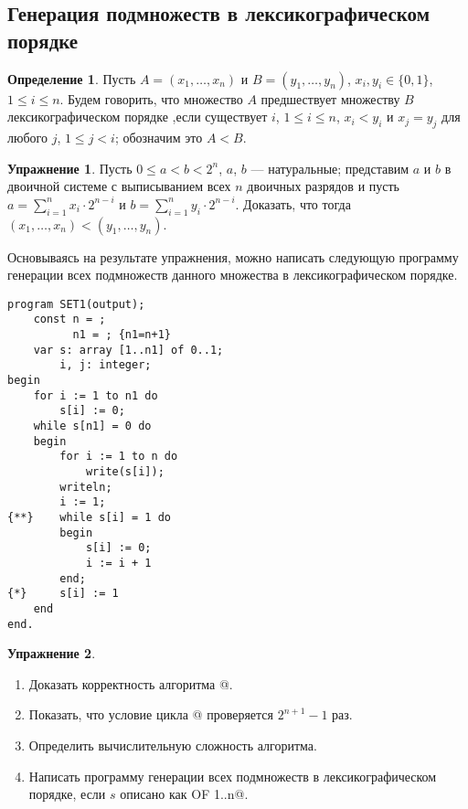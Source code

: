 \documentclass[12pt,a4paper]{article}
\theoremstyle{plain}
\theoremstyle{definition}
\newtheorem{definition}{Определение}
\newtheorem*{task}{Упражнение}
\theoremstyle{remark}
\newtheorem*{comment}{Комментарий}
\begin{document}
\subsection{Генерация подмножеств в лексикографическом порядке}
\label{sec:lex_subsets}

\begin{definition}
Пусть $A=(x_1,\ldots,x_n)$ и $B=(y_1,\ldots,y_n)$, $x_i, y_i \in \{0,1\}$, $1\le i\le n$. Будем говорить, что множество $A$ предшествует множеству $B$ лексикографическом порядке ,если существует $i$, $1\le i\le n$, $x_i<y_i$ и $x_j=y_j$ для любого $j$, $1\le j<i$; обозначим это $A<B$.
\end{definition}

\begin{task}
Пусть $0 \le a < b < 2^n$, $a$, $b$ --- натуральные; представим $a$ и $b$ в двоичной системе с выписыванием всех $n$ двоичных разрядов и пусть $a = \sum_{i=1}^n x_i\cdot 2^{n-i}$ и $b = \sum_{i=1}^n y_i\cdot 2^{n-i}$. Доказать, что тогда $(x_1,\ldots,x_n) < (y_1,\ldots,y_n)$.
\end{task}

Основываясь на результате упражнения, можно написать следующую программу генерации всех подмножеств данного множества в лексикографическом порядке.

\begin{verbatim}
program SET1(output);
    const n = ;
          n1 = ; {n1=n+1}
    var s: array [1..n1] of 0..1;
        i, j: integer;
begin
    for i := 1 to n1 do
        s[i] := 0;
    while s[n1] = 0 do
    begin
        for i := 1 to n do
            write(s[i]);
        writeln;
        i := 1;
{**}    while s[i] = 1 do
        begin
            s[i] := 0;
            i := i + 1
        end;
{*}     s[i] := 1
    end
end.
\end{verbatim}

\begin{comment}
Пусть множеству $S$ соответствует число $s$, тогда множеству, следующему за $S$, соответствует число $s+1$.
\end{comment}

\begin{task}
~\\
\begin{enumerate}
\item Доказать корректность алгоритма @.
\item Показать, что условие цикла \verb@{**}@ проверяется $2^{n+1}-1$ раз.
\item Определить вычислительную сложность алгоритма.
\item Написать программу генерации всех подмножеств в лексикографическом порядке, если $s$ описано как \verb@SET OF 1..n@.
\end{enumerate}
\end{task}
\end{document}
